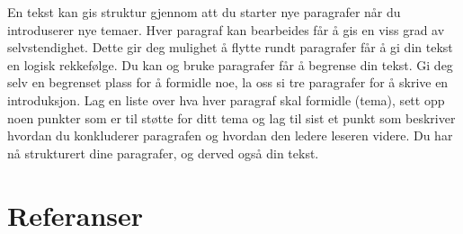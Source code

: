 \documentclass[
  letterpaper,
  DIV=11,
  numbers=noendperiod,
  oneside]{scrreprt}
\begin{document}
En tekst kan gis struktur gjennom att du starter nye paragrafer når du
introduserer nye temaer. Hver paragraf kan bearbeides får å gis en viss
grad av selvstendighet. Dette gir deg mulighet å flytte rundt paragrafer
får å gi din tekst en logisk rekkefølge. Du kan og bruke paragrafer får
å begrense din tekst. Gi deg selv en begrenset plass for å formidle noe,
la oss si tre paragrafer for å skrive en introduksjon. Lag en liste over
hva hver paragraf skal formidle (tema), sett opp noen punkter som er til
støtte for ditt tema og lag til sist et punkt som beskriver hvordan du
konkluderer paragrafen og hvordan den ledere leseren videre. Du har nå
strukturert dine paragrafer, og derved også din tekst.

\hypertarget{section-2}{%
\chapter{}\label{section-2}}


\hypertarget{referanser}{%
\chapter*{Referanser}\label{referanser}}

\end{document}
